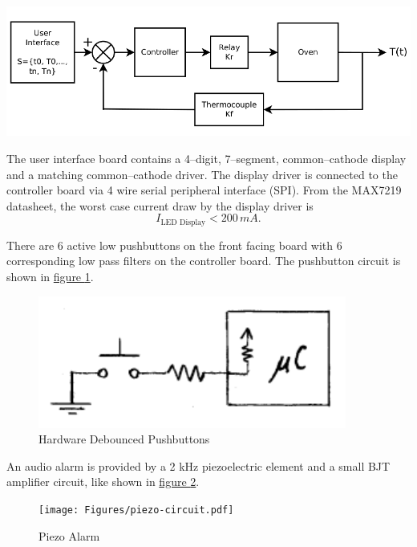 \documentclass[10pt, twocolumn]{article}
\begin{document}
\begin{center}
	\includegraphics[width=\columnwidth]{Figures/control-system.pdf}
\end{center}

The user interface board contains a 4--digit, 7--segment, common--cathode
display and a matching common--cathode driver. The display driver
is connected to the controller board via 4 wire serial peripheral interface (SPI).
From the MAX7219 datasheet, the worst case current draw by the display driver
is
\begin{equation}
I_{\textrm{LED Display}}<200\,mA.
\end{equation}

There are 6 active low
pushbuttons on the front facing board with 6 corresponding low pass filters
on the controller board. The pushbutton circuit is shown in
\hyperref[pushbutton-circuit]{figure \ref{pushbutton-circuit}}.

\begin{figure}
	\centering
	\includegraphics[width=0.8\columnwidth]{Figures/pushbutton-circuit.pdf}
	\caption{Hardware Debounced Pushbuttons}
	\label{pushbutton-circuit}
\end{figure}

An audio alarm is provided by a 2 kHz piezoelectric element and a small BJT
amplifier circuit, like shown in
\hyperref[piezo-circuit]{figure \ref{piezo-circuit}}.

\begin{figure}
	\centering
	\texttt{[image: Figures/piezo-circuit.pdf]}
	\caption{Piezo Alarm}
	\label{piezo-circuit}
\end{figure}
\end{document}
